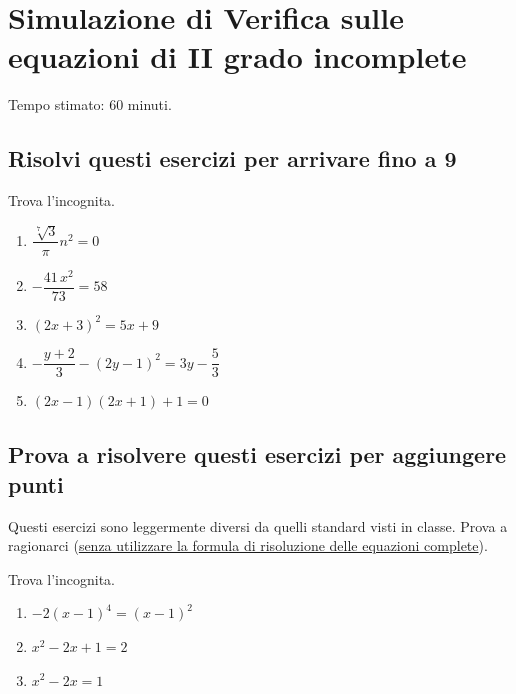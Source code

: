\documentclass[11pt]{report}
\begin{document}
\chapter*{Simulazione di Verifica sulle equazioni di II grado incomplete}
\begin{flushright}
    Tempo stimato: 60 minuti.
\end{flushright}


\section*{Risolvi questi esercizi per arrivare fino a 9}
Trova l'incognita.
\begin{enumerate}
    \item $\dfrac{\sqrt[7]{3}}\pi n^2 = 0$
    \item $-\dfrac{41\, x^2}{73} = 58$
    \item $(2x+3)^2 = 5x+9$
    \item $-\dfrac{y+2}3 - (2y-1)^2=3y-\dfrac 53$
    \item $(2x-1)(2x+1)+1=0$
\end{enumerate}

\section*{Prova a risolvere questi esercizi per aggiungere punti}
Questi esercizi sono leggermente diversi da quelli standard visti in classe. Prova a ragionarci (\ul{senza utilizzare la formula di risoluzione delle equazioni complete}).


Trova l'incognita.

\begin{enumerate}
    \item $-2(x-1)^4=(x-1)^2$
    \item $x^2-2x+1 = 2$
    \item $x^2-2x = 1$
\end{enumerate}
\end{document}
